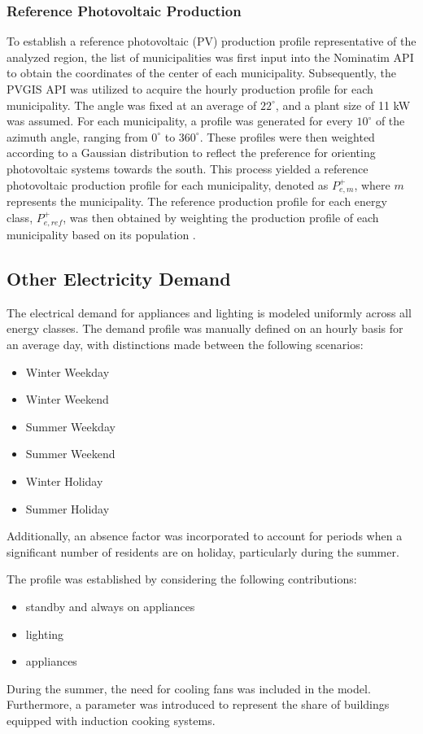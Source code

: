 \subsubsection{Reference Photovoltaic Production}
To establish a reference photovoltaic (PV) production profile representative of the analyzed region, the list of municipalities was first input into the Nominatim API \cite{Nominatim} to obtain the coordinates of the center of each municipality. Subsequently, the PVGIS API \cite{PVGIS} was utilized to acquire the hourly production profile for each municipality. The angle was fixed at an average of $22^\circ$, and a plant size of 11 kW was assumed. For each municipality, a profile was generated for every $10^\circ$ of the azimuth angle, ranging from $0^\circ$ to $360^\circ$. These profiles were then weighted according to a Gaussian distribution to reflect the preference for orienting photovoltaic systems towards the south. This process yielded a reference photovoltaic production profile for each municipality, denoted as $P_{e,m}^+$, where $m$ represents the municipality. The reference production profile for each energy class, $P_{e,ref}^+$, was then obtained by weighting the production profile of each municipality based on its population \cite{istat2023}.

\subsection{Other Electricity Demand}
The electrical demand for appliances and lighting is modeled uniformly across all energy classes. The demand profile was manually defined on an hourly basis for an average day, with distinctions made between the following scenarios:
\begin{itemize}
    \item Winter Weekday
    \item Winter Weekend
    \item Summer Weekday
    \item Summer Weekend
    \item Winter Holiday
    \item Summer Holiday
\end{itemize}
Additionally, an absence factor was incorporated to account for periods when a significant number of residents are on holiday, particularly during the summer.

The profile was established by considering the following contributions:
\begin{itemize}
    \item standby and always on appliances
    \item lighting 
    \item appliances
\end{itemize}
During the summer, the need for cooling fans was included in the model. Furthermore, a parameter was introduced to represent the share of buildings equipped with induction cooking systems.

